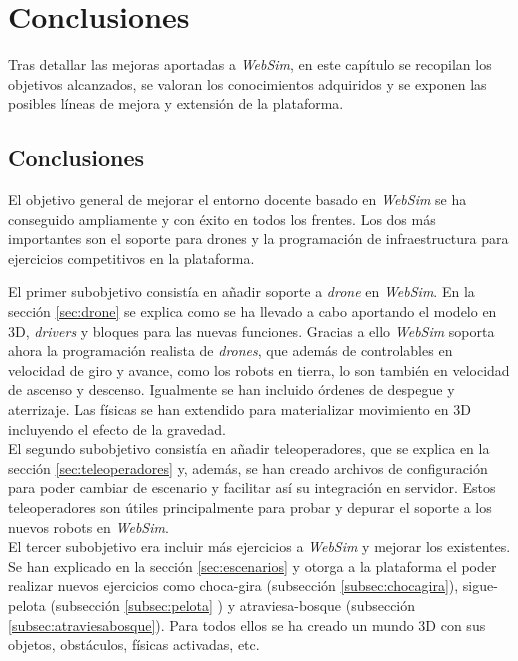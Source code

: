 \chapter{Conclusiones}
\label{chap:conclusiones}

Tras detallar las mejoras aportadas a \textit{WebSim}, en este capítulo se recopilan los objetivos alcanzados, se valoran los conocimientos adquiridos y se exponen las posibles líneas de mejora y extensión de la plataforma. 

\section{Conclusiones}
\label{sec:conclusiones}
El objetivo general de mejorar el entorno docente basado en \textit{WebSim} se ha conseguido ampliamente y con éxito en todos los frentes. Los dos más importantes son el soporte para drones y la programación de infraestructura para ejercicios competitivos en la plataforma. 

El primer subobjetivo consistía en añadir soporte a \textit{drone} en \textit{WebSim}. En la sección \ref{sec:drone} se explica como se ha llevado a cabo aportando el modelo en 3D, \textit{drivers} y bloques para las nuevas funciones. Gracias a ello \textit{WebSim} soporta ahora la programación realista de \textit{drones}, que además de controlables en velocidad de giro y avance, como los robots en tierra, lo son también en velocidad de ascenso y descenso. Igualmente se han incluido órdenes de despegue y aterrizaje. Las físicas se han extendido para materializar movimiento en 3D incluyendo el efecto de la gravedad. \\

El segundo subobjetivo consistía en añadir teleoperadores, que se explica en la sección \ref{sec:teleoperadores} y, además, se han creado archivos de configuración para poder cambiar de escenario y facilitar así su integración en servidor. Estos teleoperadores son útiles principalmente para probar y depurar el soporte a los nuevos robots en \textit{WebSim}. \\

El tercer subobjetivo era incluir más ejercicios a \textit{WebSim} y mejorar los existentes. Se han explicado en la sección \ref{sec:escenarios} y otorga a la plataforma el poder realizar nuevos ejercicios como choca-gira (subsección \ref{subsec:chocagira}), sigue-pelota (subsección \ref{subsec:pelota} ) y atraviesa-bosque (subsección \ref{subsec:atraviesabosque}).  Para todos ellos se ha creado un mundo 3D con sus objetos, obstáculos, físicas activadas, etc. \\

